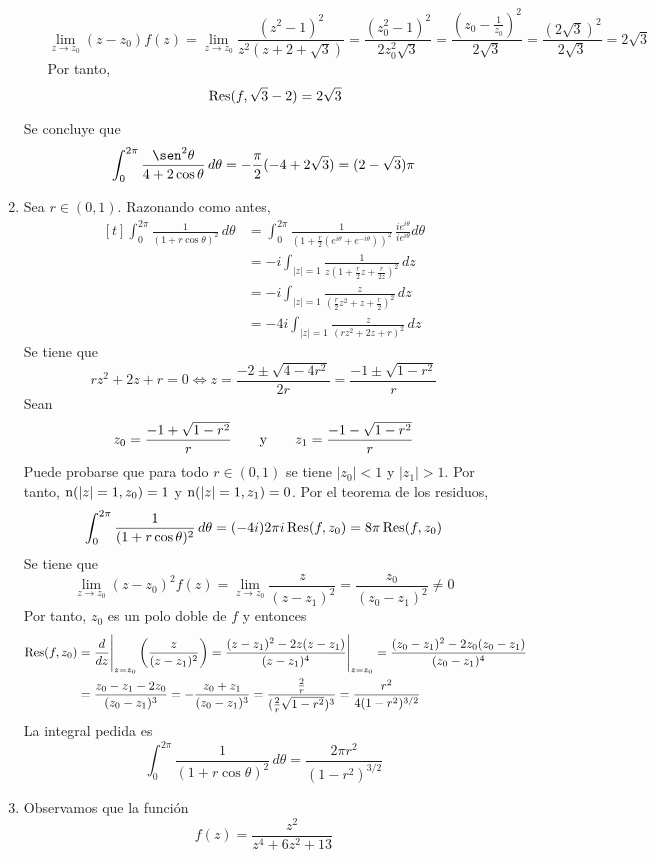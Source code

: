 \documentclass[11pt]{report}
\makeatletter
\renewenvironment{proof}[1][\proofname]{\par
  \pushQED{\qed}%
  \normalfont \topsep\z@skip %
  \trivlist
  \item[\hskip\labelsep
        \itshape
    #1\@addpunct{.}]\ignorespaces
}{%
  \popQED\endtrivlist\@endpefalse
}
\makeatother
\begin{document}
\begin{proof}
\begin{enumerate}
\begin{itemize}
      \[\lim_{z \to z_0} (z-z_0)f(z)=\lim_{z \to z_0} \frac{(z^2-1)^2}{z^2(z+2+\sqrt{3})}=\frac{(z_0^2-1)^2}{2z_0^2\sqrt{3}}=\frac{(z_0-\frac{1}{z_0})^2}{2\sqrt{3}} =\frac{(2\sqrt{3})^2}{2\sqrt{3}} = 2\sqrt{3}\]
      Por tanto,
      \[\textup{Res}(f,\sqrt{3}-2) = 2\sqrt{3}\]
    \end{itemize}
  Se concluye que
  \[\int_{0}^{2\pi} \frac{\sen^2 \theta}{4+2\cos\theta} \, d\theta =-\frac{\pi}{2}(-4+2\sqrt{3}) = (2-\sqrt{3})\pi\]
  \item Sea $r \in (0,1)$. Razonando como antes,
  \[
    \begin{aligned}[t]
    \int_0^{2\pi} \frac{1}{(1+r\cos\theta)^2} \, d\theta &= \int_0^{2\pi} \frac{1}{(1+\frac{r}{2}(e^{i\theta}+e^{-i\theta}))^2} \, \frac{ie^{i\theta}}{ie^{i\theta}} d\theta \\
    &=-i \int_{|z|=1} \frac{1}{z(1+\frac{r}{2}z+\frac{r}{2z})^2} \, dz \\
    &=-i \int_{|z|=1} \frac{z}{(\frac{r}{2}z^2+z+\frac{r}{2})^2} \, dz \\
    &=-4i \int_{|z|=1} \frac{z}{(rz^2+2z+r)^2} \, dz
  \end{aligned}
  \]
  Se tiene que
  \[rz^2+2z+r = 0 \iff z = \frac{-2\pm \sqrt{4-4r^2}}{2r} = \frac{-1\pm \sqrt{1-r^2}}{r}\]
  Sean
  \[z_0 = \frac{-1+ \sqrt{1-r^2}}{r} \qquad \textup{y} \qquad z_1 = \frac{-1- \sqrt{1-r^2}}{r}\]
  Puede probarse que para todo $r \in (0,1)$ se tiene $|z_0| < 1$ y  $|z_1| > 1$. Por tanto, $\textup{n}(|z|=1, z_0) = 1$ y $ \textup{n}(|z|=1, z_1) = 0$. Por el teorema de los residuos,
  \[\int_0^{2\pi} \frac{1}{(1+r\cos\theta)^2} \, d\theta = (-4i)2\pi i \, \textup{Res}(f,z_0)=8\pi \, \textup{Res}(f,z_0)\]
  Se tiene que
  \[\lim_{z \to z_0}(z-z_0)^2f(z)= \lim_{z \to z_0} \frac{z}{(z-z_1)^2} = \frac{z_0}{(z_0-z_1)^2} \neq 0\]
  Por tanto, $z_0$ es un polo doble de $f$ y entonces
  \[
  \begin{aligned}[t]
  \textup{Res}(f,z_0) &= \frac{d}{dz}\Bigg|_{z=z_0}\left(\frac{z}{(z-z_1)^2}\right) = \frac{(z-z_1)^2-2z(z-z_1)}{(z-z_1)^4}\Bigg|_{z=z_0} =\frac{(z_0-z_1)^2-2z_0(z_0-z_1)}{(z_0-z_1)^4} \\
  &= \frac{z_0-z_1-2z_0}{(z_0-z_1)^3} = -\frac{z_0+z_1}{(z_0-z_1)^3} = \frac{\frac{2}{r}}{(\frac{2}{r}\sqrt{1-r^2})^3} = \frac{r^2}{4(1-r^2)^{3/2}}
  \end{aligned}
  \]
  La integral pedida es
  \[\int_0^{2\pi} \frac{1}{(1+r\cos\theta)^2} \, d\theta = \frac{2\pi r^2}{(1-r^2)^{3/2}}\]
  \item Observamos que la función
  \[f(z)=\frac{z^2}{z^4+6z^2+13}\]

\end{enumerate}
\end{proof}
\end{document}
